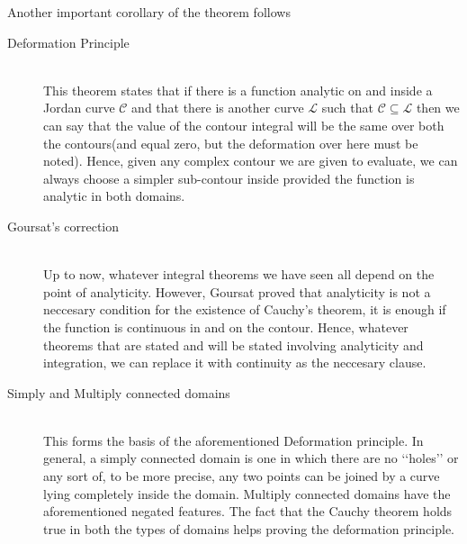 \documentclass[11pt]{article}
\begin{document}
\begin{sloppypar}
Another important corollary of the theorem follows
\begin{description}
\item[Deformation Principle] \hfill \\
	This theorem states that if there is a function analytic on and inside a Jordan curve $\mathcal{C}$ and that there is another curve $\mathcal{L}$ such that $\mathcal{C} \subseteq \mathcal{L}$ then we can say that the value of the contour integral will be the same over both the contours(and equal zero, but the deformation over here must be noted). Hence, given any complex contour we are given to evaluate, we can always choose a simpler sub-contour inside provided the function is analytic in both domains.
\item[Goursat\rq{}s correction] \hfill \\
	Up to now, whatever integral theorems we have seen all depend on the point of analyticity. However, Goursat proved that analyticity is not a neccesary condition for the existence of Cauchy\rq{}s theorem, it is enough if the function is continuous in and on the contour. Hence, whatever theorems that are stated and will be stated involving analyticity and integration, we can replace it with continuity as the neccesary clause.
\item[Simply and Multiply connected domains] \hfill \\
	This forms the basis of the aforementioned Deformation principle. In general, a simply connected domain is one in which there are no \lq\lq{}holes\rq\rq{} or any sort of, to be more precise, any two points can be joined by a curve lying completely inside the domain. Multiply connected domains have the aforementioned negated features. The fact that the Cauchy theorem holds true in both the types of domains helps proving the deformation principle.
\end{description}

\end{sloppypar}
\end{document}

